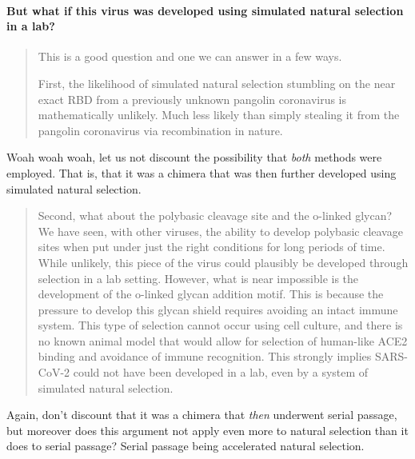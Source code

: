 \documentclass[11pt]{article}
\begin{document}
\paragraph{But what if this virus was developed using simulated natural selection in a lab?}
\label{sec:org5ed4ac1}
\begin{quote}
This is a good question and one we can answer in a few ways.

First, the likelihood of simulated natural selection stumbling on the near exact RBD from a previously unknown pangolin coronavirus is mathematically unlikely. Much less likely than simply stealing it from the pangolin coronavirus via recombination in nature.
\end{quote}
Woah woah woah, let us not discount the possibility that \emph{both} methods were employed. That is, that it was a chimera that was then further developed using simulated natural selection.

\begin{quote}
Second, what about the polybasic cleavage site and the o-linked glycan? We have seen, with other viruses, the ability to develop polybasic cleavage sites when put under just the right conditions for long periods of time. While unlikely, this piece of the virus could plausibly be developed through selection in a lab setting. However, what is near impossible is the development of the o-linked glycan addition motif. This is because the pressure to develop this glycan shield requires avoiding an intact immune system. This type of selection cannot occur using cell culture, and there is no known animal model that would allow for selection of human-like ACE2 binding and avoidance of immune recognition. This strongly implies SARS-CoV-2 could not have been developed in a lab, even by a system of simulated natural selection.
\end{quote}
Again, don't discount that it was a chimera that \emph{then} underwent serial passage, but moreover does this argument not apply even more to natural selection than it does to serial passage? Serial passage being accelerated natural selection.
\end{document}
